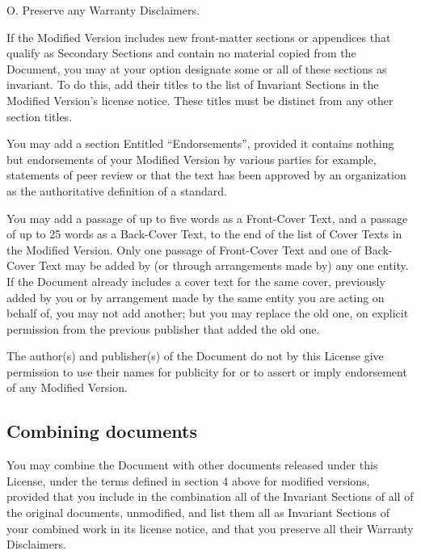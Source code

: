 {\tiny{}O. Preserve any Warranty Disclaimers.}{\tiny\par}

{\tiny{}If the Modified Version includes new front-matter sections
or appendices that qualify as Secondary Sections and contain no material
copied from the Document, you may at your option designate some or
all of these sections as invariant. To do this, add their titles to
the list of Invariant Sections in the Modified Version's license notice.
These titles must be distinct from any other section titles.}{\tiny\par}

{\tiny{}You may add a section Entitled \textsf{``}Endorsements\textsf{''}, provided
it contains nothing but endorsements of your Modified Version by various
parties \textemdash{} for example, statements of peer review or that
the text has been approved by an organization as the authoritative
definition of a standard.}{\tiny\par}

{\tiny{}You may add a passage of up to five words as a Front-Cover
Text, and a passage of up to 25 words as a Back-Cover Text, to the
end of the list of Cover Texts in the Modified Version. Only one passage
of Front-Cover Text and one of Back-Cover Text may be added by (or
through arrangements made by) any one entity. If the Document already
includes a cover text for the same cover, previously added by you
or by arrangement made by the same entity you are acting on behalf
of, you may not add another; but you may replace the old one, on explicit
permission from the previous publisher that added the old one.}{\tiny\par}

{\tiny{}The author(s) and publisher(s) of the Document do not by this
License give permission to use their names for publicity for or to
assert or imply endorsement of any Modified Version.}{\tiny\par}

\subsection*{{\tiny{}Combining documents}}

{\tiny{}You may combine the Document with other documents released
under this License, under the terms defined in section 4 above for
modified versions, provided that you include in the combination all
of the Invariant Sections of all of the original documents, unmodified,
and list them all as Invariant Sections of your combined work in its
license notice, and that you preserve all their Warranty Disclaimers.}{\tiny\par}

